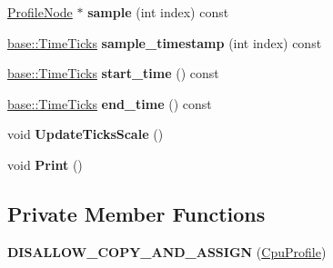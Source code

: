 \begin{DoxyCompactItemize}
\item 
\hyperlink{classv8_1_1internal_1_1_profile_node}{Profile\+Node} $\ast$ {\bfseries sample} (int index) const \hypertarget{classv8_1_1internal_1_1_cpu_profile_a82ca9b7c41faa9bec21e5d200c7eb19b}{}\label{classv8_1_1internal_1_1_cpu_profile_a82ca9b7c41faa9bec21e5d200c7eb19b}

\item 
\hyperlink{classv8_1_1base_1_1_time_ticks}{base\+::\+Time\+Ticks} {\bfseries sample\+\_\+timestamp} (int index) const \hypertarget{classv8_1_1internal_1_1_cpu_profile_a5401725d0db6602b03ffd4201aec25e7}{}\label{classv8_1_1internal_1_1_cpu_profile_a5401725d0db6602b03ffd4201aec25e7}

\item 
\hyperlink{classv8_1_1base_1_1_time_ticks}{base\+::\+Time\+Ticks} {\bfseries start\+\_\+time} () const \hypertarget{classv8_1_1internal_1_1_cpu_profile_a0dceabcb534acd77df948f741dfaae2f}{}\label{classv8_1_1internal_1_1_cpu_profile_a0dceabcb534acd77df948f741dfaae2f}

\item 
\hyperlink{classv8_1_1base_1_1_time_ticks}{base\+::\+Time\+Ticks} {\bfseries end\+\_\+time} () const \hypertarget{classv8_1_1internal_1_1_cpu_profile_ac39a426d7cd0308d018e8264ac3cb403}{}\label{classv8_1_1internal_1_1_cpu_profile_ac39a426d7cd0308d018e8264ac3cb403}

\item 
void {\bfseries Update\+Ticks\+Scale} ()\hypertarget{classv8_1_1internal_1_1_cpu_profile_a66f5b3ad5fe0fcf040e8274e5238441d}{}\label{classv8_1_1internal_1_1_cpu_profile_a66f5b3ad5fe0fcf040e8274e5238441d}

\item 
void {\bfseries Print} ()\hypertarget{classv8_1_1internal_1_1_cpu_profile_a5dc2db626ffd25bf1db98cc0aa9ca906}{}\label{classv8_1_1internal_1_1_cpu_profile_a5dc2db626ffd25bf1db98cc0aa9ca906}

\end{DoxyCompactItemize}
\subsection*{Private Member Functions}
\begin{DoxyCompactItemize}
\item 
{\bfseries D\+I\+S\+A\+L\+L\+O\+W\+\_\+\+C\+O\+P\+Y\+\_\+\+A\+N\+D\+\_\+\+A\+S\+S\+I\+GN} (\hyperlink{classv8_1_1internal_1_1_cpu_profile}{Cpu\+Profile})\hypertarget{classv8_1_1internal_1_1_cpu_profile_a88bbe440d626543bd3550f5d8112b447}{}\label{classv8_1_1internal_1_1_cpu_profile_a88bbe440d626543bd3550f5d8112b447}

\end{DoxyCompactItemize}
